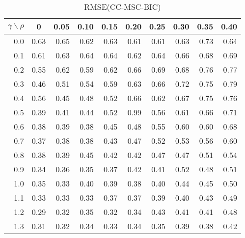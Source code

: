 \documentclass[12pt]{article}
\begin{document}
\begin{table}[!tbp]
\caption{RMSE(CC-MSC-BIC)}
 \begin{center}
 \begin{tabular}{r|rrrrrrrrr}\hline\hline
\multicolumn{1}{c|}{$\gamma\backslash\rho$}&\multicolumn{1}{c}{0}&\multicolumn{1}{c}{0.05}&\multicolumn{1}{c}{0.10}&\multicolumn{1}{c}{0.15}&\multicolumn{1}{c}{0.20}&\multicolumn{1}{c}{0.25}&\multicolumn{1}{c}{0.30}&\multicolumn{1}{c}{0.35}&\multicolumn{1}{c}{0.40}\tabularnewline
\hline


0.0&0.63&0.65&0.62&0.63&0.61&0.61&0.63&0.73&0.64\tabularnewline
0.1&0.61&0.63&0.64&0.64&0.62&0.64&0.66&0.68&0.69\tabularnewline
0.2&0.55&0.62&0.59&0.62&0.66&0.69&0.68&0.76&0.77\tabularnewline
0.3&0.46&0.51&0.54&0.59&0.63&0.66&0.72&0.75&0.79\tabularnewline
0.4&0.56&0.45&0.48&0.52&0.66&0.62&0.67&0.75&0.76\tabularnewline
0.5&0.39&0.41&0.44&0.52&0.99&0.56&0.61&0.66&0.71\tabularnewline
0.6&0.38&0.39&0.38&0.45&0.48&0.55&0.60&0.60&0.68\tabularnewline
0.7&0.37&0.38&0.38&0.43&0.47&0.52&0.53&0.56&0.60\tabularnewline
0.8&0.38&0.39&0.45&0.42&0.42&0.47&0.47&0.51&0.54\tabularnewline
0.9&0.34&0.36&0.35&0.37&0.42&0.41&0.52&0.48&0.51\tabularnewline
1.0&0.35&0.33&0.40&0.39&0.38&0.40&0.44&0.45&0.50\tabularnewline
1.1&0.33&0.33&0.33&0.37&0.37&0.39&0.40&0.43&0.49\tabularnewline
1.2&0.29&0.32&0.35&0.32&0.34&0.43&0.41&0.41&0.48\tabularnewline
1.3&0.31&0.32&0.34&0.33&0.34&0.35&0.39&0.38&0.42\tabularnewline
\hline
\end{tabular}

\end{center}

\end{table}

%
\end{document}

